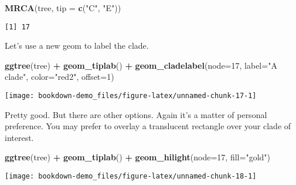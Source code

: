 \documentclass[]{book}
\newenvironment{Shaded}{\begin{snugshade}}{\end{snugshade}}
\newcommand{\KeywordTok}[1]{\textcolor[rgb]{0.13,0.29,0.53}{\textbf{#1}}}
\newcommand{\DataTypeTok}[1]{\textcolor[rgb]{0.13,0.29,0.53}{#1}}
\newcommand{\DecValTok}[1]{\textcolor[rgb]{0.00,0.00,0.81}{#1}}
\newcommand{\StringTok}[1]{\textcolor[rgb]{0.31,0.60,0.02}{#1}}
\newcommand{\OperatorTok}[1]{\textcolor[rgb]{0.81,0.36,0.00}{\textbf{#1}}}
\newcommand{\NormalTok}[1]{#1}
\begin{document}
\begin{Shaded}
\begin{Highlighting}[]
\KeywordTok{MRCA}\NormalTok{(tree, }\DataTypeTok{tip =} \KeywordTok{c}\NormalTok{(}\StringTok{"C"}\NormalTok{, }\StringTok{"E"}\NormalTok{))}
\end{Highlighting}
\end{Shaded}

\begin{verbatim}
[1] 17
\end{verbatim}

Let's use a new geom to label the clade.

\begin{Shaded}
\begin{Highlighting}[]
\KeywordTok{ggtree}\NormalTok{(tree) }\OperatorTok{+}\StringTok{ }
\StringTok{  }\KeywordTok{geom_tiplab}\NormalTok{() }\OperatorTok{+}\StringTok{ }
\StringTok{  }\KeywordTok{geom_cladelabel}\NormalTok{(}\DataTypeTok{node=}\DecValTok{17}\NormalTok{, }
                  \DataTypeTok{label=}\StringTok{"A clade"}\NormalTok{, }
                  \DataTypeTok{color=}\StringTok{"red2"}\NormalTok{, }
                  \DataTypeTok{offset=}\DecValTok{1}\NormalTok{)}
\end{Highlighting}
\end{Shaded}

\begin{center}\texttt{[image: bookdown-demo\_files/figure-latex/unnamed-chunk-17-1]} \end{center}

Pretty good. But there are other options. Again it's a matter of
personal preference. You may prefer to overlay a translucent rectangle
over your clade of interest.

\begin{Shaded}
\begin{Highlighting}[]
\KeywordTok{ggtree}\NormalTok{(tree) }\OperatorTok{+}\StringTok{ }
\StringTok{  }\KeywordTok{geom_tiplab}\NormalTok{() }\OperatorTok{+}\StringTok{ }
\StringTok{  }\KeywordTok{geom_hilight}\NormalTok{(}\DataTypeTok{node=}\DecValTok{17}\NormalTok{, }\DataTypeTok{fill=}\StringTok{"gold"}\NormalTok{)}
\end{Highlighting}
\end{Shaded}

\begin{center}\texttt{[image: bookdown-demo\_files/figure-latex/unnamed-chunk-18-1]} \end{center}
\end{document}
